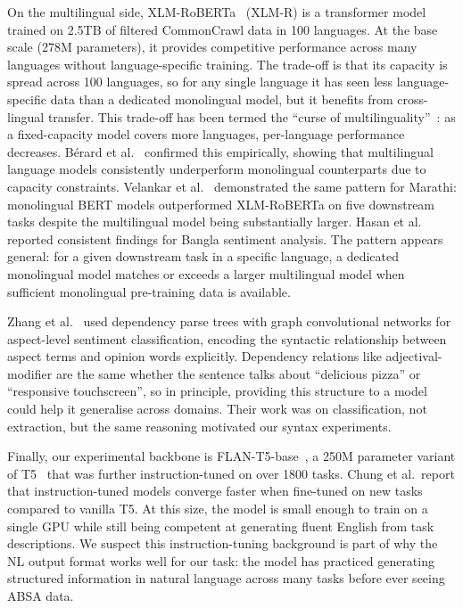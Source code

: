 \documentclass[12pt,a4paper]{report}
\begin{document}
On the multilingual side, XLM-RoBERTa~\cite{conneau2020unsupervised} (XLM-R) is a transformer model trained on 2.5TB of filtered CommonCrawl data in 100 languages. At the base scale (278M parameters), it provides competitive performance across many languages without language-specific training. The trade-off is that its capacity is spread across 100 languages, so for any single language it has seen less language-specific data than a dedicated monolingual model, but it benefits from cross-lingual transfer. This trade-off has been termed the ``curse of multilinguality''~\cite{chang2023multilinguality, pfeiffer2024breaking}: as a fixed-capacity model covers more languages, per-language performance decreases. Bérard et al.~\cite{berard2026capacity} confirmed this empirically, showing that multilingual language models consistently underperform monolingual counterparts due to capacity constraints. Velankar et al.~\cite{velankar2022mono} demonstrated the same pattern for Marathi: monolingual BERT models outperformed XLM-RoBERTa on five downstream tasks despite the multilingual model being substantially larger. Hasan et al.~\cite{tanvir2023bangla} reported consistent findings for Bangla sentiment analysis. The pattern appears general: for a given downstream task in a specific language, a dedicated monolingual model matches or exceeds a larger multilingual model when sufficient monolingual pre-training data is available.

Zhang et al.~\cite{zhang2019aspect} used dependency parse trees with graph convolutional networks for aspect-level sentiment classification, encoding the syntactic relationship between aspect terms and opinion words explicitly. Dependency relations like adjectival-modifier are the same whether the sentence talks about ``delicious pizza'' or ``responsive touchscreen'', so in principle, providing this structure to a model could help it generalise across domains. Their work was on classification, not extraction, but the same reasoning motivated our syntax experiments.

Finally, our experimental backbone is FLAN-T5-base~\cite{chung2022scaling}, a 250M parameter variant of T5~\cite{raffel2020exploring} that was further instruction-tuned on over 1800 tasks. Chung et al.\ report that instruction-tuned models converge faster when fine-tuned on new tasks compared to vanilla T5. At this size, the model is small enough to train on a single GPU while still being competent at generating fluent English from task descriptions. We suspect this instruction-tuning background is part of why the NL output format works well for our task: the model has practiced generating structured information in natural language across many tasks before ever seeing ABSA data.
\end{document}
